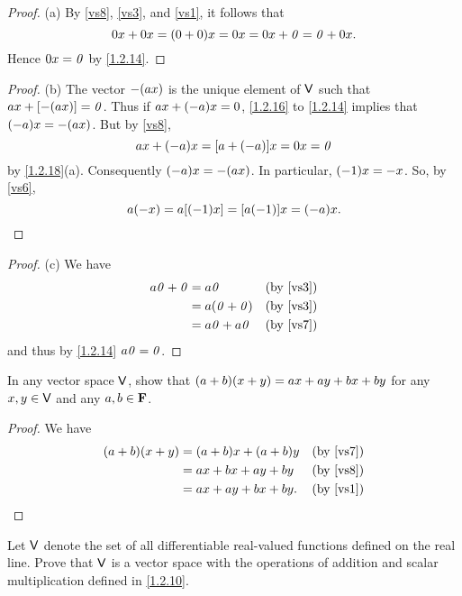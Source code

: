\begin{proof}{(a)}
  By \ref{vs8}, \ref{vs3}, and \ref{vs1}, it follows that
  \[
    0x + 0x = \p{0 + 0} x = 0x = 0x + \zv = \zv + 0x.
  \]
  Hence \(0x = \mathit{0}\) by \cref{1.2.14}.
\end{proof}

\begin{proof}{(b)}
  The vector \(-\p{ax}\) is the unique element of \(\mathsf{V}\) such that \(ax + \bk{-\p{ax}} = \zv\).
  Thus if \(ax + \p{-a}x = 0\), \cref{1.2.16} to \cref{1.2.14} implies that \(\p{-a}x = -\p{ax}\).
  But by \ref{vs8},
  \[
    ax + \p{-a}x = \bk{a + \p{-a}}x = 0x = \zv
  \]
  by \cref{1.2.18}(a).
  Consequently \(\p{-a}x = -\p{ax}\).
  In particular, \(\p{-1}x = -x\).
  So, by \ref{vs6},
  \[
    a\p{-x} = a\bk{\p{-1}x} = \bk{a\p{-1}}x = \p{-a}x.
  \]
\end{proof}

\begin{proof}{(c)}
  We have
  \begin{align*}
    a\zv + \zv & = a\zv           &  & \text{(by \ref{vs3})} \\
               & = a\p{\zv + \zv} &  & \text{(by \ref{vs3})} \\
               & = a\zv + a\zv    &  & \text{(by \ref{vs7})}
  \end{align*}
  and thus by \cref{1.2.14} \(a\mathit{0} = \mathit{0}\).
\end{proof}

\exercisesection

\setcounter{ex}{7}
\begin{ex}\label{ex:1.2.8}
  In any vector space \(\mathsf{V}\), show that \(\p{a + b}\p{x + y} = ax + ay + bx + by\) for any \(x, y \in \mathsf{V}\) and any \(a, b \in \mathbf{F}\).
\end{ex}

\begin{proof}
  We have
  \begin{align*}
    \p{a + b}\p{x + y} & = \p{a + b} x + \p{a + b} y &  & \text{(by \ref{vs7})} \\
                       & = ax + bx + ay + by         &  & \text{(by \ref{vs8})} \\
                       & = ax + ay + bx + by.        &  & \text{(by \ref{vs1})}
  \end{align*}
\end{proof}

\setcounter{ex}{9}
\begin{ex}\label{ex:1.2.10}
  Let \(\mathsf{V}\) denote the set of all differentiable real-valued functions defined on the real line.
  Prove that \(\mathsf{V}\) is a vector space with the operations of addition and scalar multiplication defined in \cref{1.2.10}.
\end{ex}

